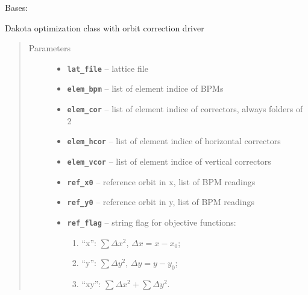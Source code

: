\documentclass[letterpaper,10pt,english]{sphinxmanual}
\begin{document}

\begin{fulllineitems}
\label{src/apidocs/genopt:genopt.DakotaOC}
Bases: {\hyperref[src/apidocs/dakopt:genopt.dakopt.DakotaBase]{}}

Dakota optimization class with orbit correction driver
\begin{quote}\begin{description}
\item[{Parameters}] \leavevmode\begin{itemize}
\item {} 
\textbf{\texttt{lat\_file}} -- lattice file

\item {} 
\textbf{\texttt{elem\_bpm}} -- list of element indice of BPMs

\item {} 
\textbf{\texttt{elem\_cor}} -- list of element indice of correctors, always folders of 2

\item {} 
\textbf{\texttt{elem\_hcor}} -- list of element indice of horizontal correctors

\item {} 
\textbf{\texttt{elem\_vcor}} -- list of element indice of vertical correctors

\item {} 
\textbf{\texttt{ref\_x0}} -- reference orbit in x, list of BPM readings

\item {} 
\textbf{\texttt{ref\_y0}} -- reference orbit in y, list of BPM readings

\item {} 
\textbf{\texttt{ref\_flag}} -- 
string flag for objective functions:
\begin{enumerate}
\item {} 
``x'': \(\sum \Delta x^2\), \(\Delta x = x-x_0\);

\item {} 
``y'': \(\sum \Delta y^2\), \(\Delta y = y-y_0\);

\item {} 
``xy'': \(\sum \Delta x^2 + \sum \Delta y^2\).


\end{enumerate}
\end{itemize}
\end{description}
\end{quote}
\end{fulllineitems}
\end{document}

